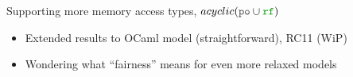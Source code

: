 \begin{frame}{Supporting more memory access types, \sout{$acyclic(\lPO \cup \lRF)$}}
  \begin{itemize}
  \item Extended results to OCaml model (straightforward), RC11 (WiP)
  \item Wondering what ``fairness'' means for even more relaxed models
  \end{itemize}

  \vspace{0.5cm}
  \renewcommand{\ULthickness}{0.75pt}

\end{frame}

